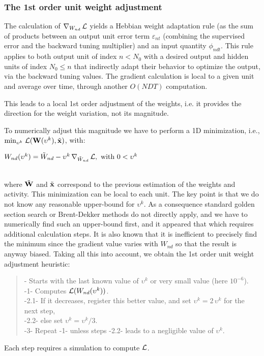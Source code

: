 \subsubsection*{The 1st order unit weight adjustment}

The calculation of $\nabla_{W_{nd}}\, {\cal L} $ yields a Hebbian weight adaptation rule (as the sum of products between an output unit error term $\varepsilon_{nt}$ (combining the supervised error and the backward tuning multiplier) and an input quantity $\phi_{ndt}$. This rule applies to both output unit of index $n < N_0$ with a desired output and hidden units of index $N_0 \leq n$ that indirectly adapt their behavior to optimize the output, via the backward tuning values. The gradient calculation is local to a given unit and average over time, through another $O(NDT)$ computation.

This leads to a local 1st order adjustment of the weights, i.e. it provides the direction for the weight variation, not its magnitude.

To numerically adjust this magnitude we have to perform a 1D minimization, i.e., $\mbox{min}_{\upsilon^k} \; {\cal L}({\bf W}(\upsilon^k) , \tilde{\bf x})$, with:
\\\centerline{$W_{nd}(\upsilon^k) = \tilde{W}_{nd} - \upsilon^k \, \nabla_{\tilde{W}_{nd}} \, {\cal L}, \mbox{ with } 0 < \upsilon^k$} \\
where $\tilde{\bf W}$ and $\tilde{\bf x}$ correspond to the previous estimation of the weights and activity. This minimization can be local to each unit. The key point is that we do not know any reasonable upper-bound for $\upsilon^k$. As a consequence standard golden section search or Brent-Dekker methods do not directly apply, and we have to numerically find such an upper-bound first, and it appeared that which requires additional calculation steps. It is also known that it is inefficient to precisely find the minimum since the gradient value varies with $W_{nd}$ so that the result is anyway biased. Taking all this into account, we obtain the 1st order unit weight adjustment heuristic:\begin{quotation}{\small 
{}- Starts with the last known value of $\upsilon^k$ or very small value (here $10^{-6}$).
\\-1- Computes ${\cal L}(W_{nd}(\upsilon^k))$.
\\\hspace{0.5cm} -2.1- If it decreases, register this better value, and set $\upsilon^k = 2\, \upsilon^k$ for the next step, 
\\\hspace{0.5cm} -2.2- else set $\upsilon^k = \upsilon^k / 3$.
\\-3- Repeat -1- unless steps -2.2- leads to a negligible value of $\upsilon^k$.
}\end{quotation}
Each step requires a simulation to compute ${\cal L}$.

